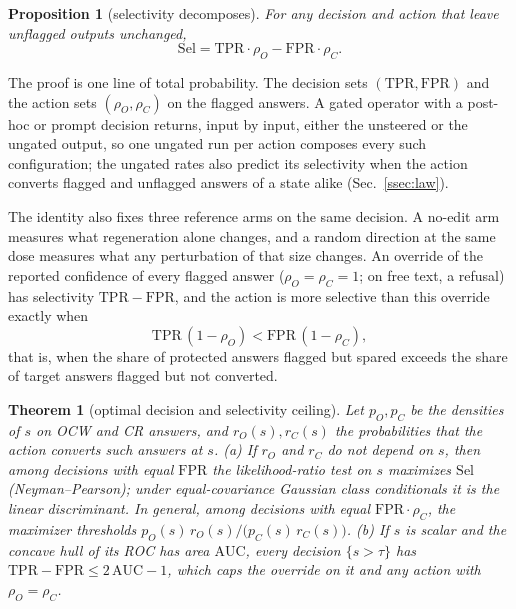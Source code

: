 \documentclass{article}
\newtheorem{theorem}{Theorem}
\newtheorem{proposition}{Proposition}
\newcommand{\ocw}{OCW}
\newcommand{\crok}{CR}
\begin{document}
\begin{proposition}[selectivity decomposes]
\label{prop:account}
For any decision and action that leave unflagged outputs unchanged,
\begin{equation}
\mathrm{Sel}=\mathrm{TPR}\cdot\rho_O-\mathrm{FPR}\cdot\rho_C .
\label{eq:account}
\end{equation}
\end{proposition}

The proof is one line of total probability. The decision sets
$(\mathrm{TPR},\mathrm{FPR})$ and the action sets $(\rho_O,\rho_C)$ on the
flagged answers. A gated operator with a post-hoc or prompt decision returns,
input by input, either the unsteered or the ungated output, so one ungated run
per action composes every such configuration; the ungated rates also predict
its selectivity when the action converts flagged and unflagged answers of a
state alike (Sec.~\ref{ssec:law}).

The identity also fixes three reference arms on the same decision. A no-edit
arm measures what regeneration alone changes, and a random direction at the
same dose measures what any perturbation of that size changes. An override of
the reported confidence of every flagged answer ($\rho_O=\rho_C=1$; on free
text, a refusal) has selectivity $\mathrm{TPR}-\mathrm{FPR}$, and the action is
more selective than this override exactly when
\begin{equation}
\mathrm{TPR}\,(1-\rho_O)<\mathrm{FPR}\,(1-\rho_C),
\label{eq:override}
\end{equation}
that is, when the share of protected answers flagged but spared exceeds the
share of target answers flagged but not converted.

\begin{theorem}[optimal decision and selectivity ceiling]
\label{thm:gate}
Let $p_O,p_C$ be the densities of $s$ on \ocw{} and \crok{} answers, and
$r_O(s),r_C(s)$ the probabilities that the action converts such answers at
$s$.
(a) If $r_O$ and $r_C$ do not depend on $s$, then among decisions with equal
$\mathrm{FPR}$ the likelihood-ratio test on $s$ maximizes $\mathrm{Sel}$
(Neyman--Pearson); under equal-covariance Gaussian
class conditionals it is the linear discriminant. In general, among decisions
with equal $\mathrm{FPR}\cdot\rho_C$, the maximizer thresholds
$p_O(s)\,r_O(s)/\big(p_C(s)\,r_C(s)\big)$.
(b) If $s$ is scalar and the concave hull of its ROC has area $\mathrm{AUC}$,
every decision $\{s>\tau\}$ has $\mathrm{TPR}-\mathrm{FPR}\le2\,\mathrm{AUC}-1$,
which caps the override on it and any action with $\rho_O=\rho_C$.
\end{theorem}
\end{document}
